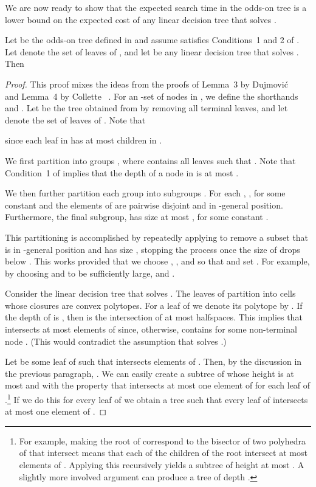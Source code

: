\documentclass{patmorin}
\begin{document}
We are now ready to show that the expected search time in the odds-on
tree is a lower bound on the expected cost of any linear decision tree
that solves .

\begin{lem}
  Let  be the odds-on tree defined in
   and assume  satisfies
  Conditions~1 and 2 of .  Let  denote
  the set of leaves of , and let  be any linear
  decision tree that solves .  Then
  
\end{lem}

\begin{proof}
  This proof mixes the ideas from the proofs of Lemma~3 by Dujmovi\'c
  \etal\ \cite{dhm09} and Lemma~4 by Collette \etal\ \cite{cdilm08}.
  For an -set  of nodes in , we define the
  shorthands  and .  Let 
  be the tree obtained from  by removing all terminal
  leaves, and let  denote the set of leaves of .  Note that
  
  since each leaf in  has at most  children in . 

  We first partition  into groups , where 
  contains all leaves  such that .  Note that Condition~1 of 
  implies that the depth of a node in  is at most .

  We then further partition each group  into subgroups
  . For each ,
  , for some constant 
  and the elements of  are pairwise disjoint and in
  -general position.  Furthermore, the final subgroup, 
  has size at most , for some constant .

  This partitioning is accomplished by repeatedly applying
   to remove a subset 
  that is in -general position and has size ,
  stopping the process once the size of  drops below . This works provided that we choose , , and 
  so that  and
  set .
  For example, by choosing  and  to be sufficiently large,
   and .

  Consider the linear decision tree  that solves .
  The leaves of  partition  into cells whose closures are
  convex polytopes.  For a leaf  of  we denote its polytope
  by . If the depth of  is , then  is
  the intersection of  at most  halfspaces.  This implies that
   intersects at most  elements of  since,
  otherwise,  contains  for some non-terminal node
  .  (This would contradict the assumption that 
  solves .)

  Let  be some leaf of  such that  intersects 
  elements of .  Then, by the discussion in the previous
  paragraph, .  We can easily create a
  subtree  of  whose height is at most  and with the property
  that  intersects at most one element of 
  for each leaf  of .\footnote{For example, making the root of
   correspond to the bisector of two polyhedra of 
  that intersect  means that each of the children of the root
  intersect at most  elements of . Applying this
  recursively yields a subtree of height at most .  A slightly more
  involved argument can produce a tree  of depth .} If
  we do this for every leaf  of  we obtain a tree 
  such that every leaf of  intersects at most one element
  of .


\end{proof}
\end{document}

